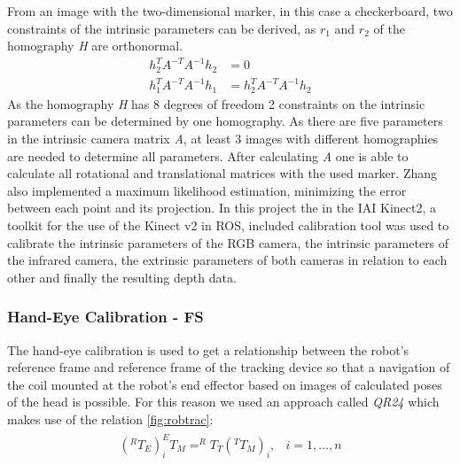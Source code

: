 \documentclass[conference]{IEEEtran}
\begin{document}
From an image with the two-dimensional marker, in this case a checkerboard, two constraints of the intrinsic parameters can be derived, as $r_1$ and $r_2$ of the homography \textit{H} are orthonormal.
\begin{align*}
h^T_2 A^{-T}A^{-1}h_2&=0\\
h^T_1 A^{-T} A^{-1} h_1&=h^T_2 A^{-T} A^{-1} h_2
\end{align*}
As the homography \textit{H} has 8 degrees of freedom 2 constraints on the intrinsic parameters can be determined by one homography. As there are five parameters in the intrinsic camera matrix \textit{A}, at least 3 images with different homographies are needed to determine all parameters. After calculating \textit{A} one is able to calculate all rotational and translational matrices with the used marker. Zhang also implemented a maximum likelihood estimation, minimizing the error between each point and its projection. \cite{camercalibrationzhang}
In this project the in the IAI Kinect2, a toolkit for the use of the Kinect v2 in ROS, included calibration tool was used to calibrate the intrinsic parameters of the RGB camera, the intrinsic parameters of the infrared camera, the extrinsic parameters of both cameras in relation to each other and finally the resulting depth data.\cite{iai_kinect2}
\subsubsection{Hand-Eye Calibration - FS}
The hand-eye calibration is used to get a relationship between the robot's reference frame and reference frame of the tracking device so that a navigation of the coil mounted at the robot's end effector based on images of calculated poses of the head is possible. For this reason we used an approach called \textit{QR24} which makes use of the relation \ref{fig:robtrac}:
\begin{align*}
\begin{array}{ll}
    (^RT_E)_i ^ET_M = ^RT_T (^TT_M)_i, & i=1,\dots,n
\end{array}
\end{align*}
\end{document}
